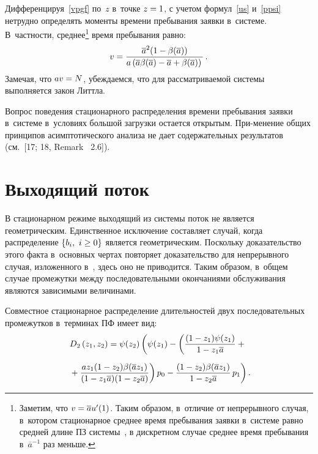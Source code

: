 \begin{multicols}{2}
Дифференцируя~\eqref{vpgf} по~$z$ в~точке $z\hm=1$,
с учетом формул~\eqref{us} и~\eqref{ppsi} нетрудно определять моменты времени
пребывания заявки в~системе. В~частности, среднее\footnote{Заметим, что
$v\hm=\overline{a} u'(1)$. Таким образом, в~отличие
от непрерывного случая, в~котором стационарное среднее время пребывания
заявки в~системе равно средней длине ПЗ системы~\cite[Corollary~2]{Mat-2},
в дискретном случае среднее время пребывания в~$\overline{a}^{-1}$ раз меньше.}
 время пребывания равно:
 \noindent
\begin{equation}
\label{vre}
v=\displaystyle\frac{\displaystyle \overline{a}^2 (1- \beta(\overline{a}))\mathstrut}{\displaystyle  a \left (\overline{a}
 \beta(\overline{a})- \overline{a} + \beta(\overline{a})\right )\mathstrut}\,.
\end{equation}
Замечая, что $av\hm=N$, убеждаемся, что для рас\-смат\-ри\-ва\-емой системы
выполняется закон Литтла.

Вопрос поведения стационарного распределения времени пребывания заявки
в~системе в~условиях большой загрузки
остается открытым. При-\linebreak менение общих принципов асимптотического \mbox{анализа}
не дает содержательных результатов (см.~[17; 18, Remark ~2.6]).



\section{Выходящий поток}

В стационарном режиме выходящий из системы поток не является геометрическим.
Единственное исключение составляет случай, когда распределение $\{ b_i, \ i \hm\ge 0 \}$
является геометрическим. Поскольку доказательство этого факта в~основных чертах\linebreak
 повторяет
доказательство для непрерывного случая, изложенного в~\cite{finch}, здесь оно не 
приводится.\linebreak
Таким образом, в~общем случае промежутки между последовательными окончаниями
обслуживания являются зависимыми величинами.


Совместное стационарное распределение длительностей двух последовательных промежутков
в~терминах ПФ имеет вид:
\begin{multline*}
D_2\left(z_1,z_2\right)
= \psi(z_2) \left ( \psi(z_1) -
\left (
\displaystyle\frac{\displaystyle (1 - z_1) \psi(z_1) \mathstrut}{\displaystyle 1 -  z_1 \overline{a}\mathstrut}
+ {}\right.\right.\\[6pt]
\left.\left.{}+\displaystyle\frac{\displaystyle a z_1 (1 - z_2) \beta(\overline{a} z_1)\mathstrut}{\displaystyle (1 - z_1 \overline{a})
(1 - z_2 \overline{a})\mathstrut}
\right)
 p_0 -
 \displaystyle\frac{\displaystyle  (1 -z_2) \beta(\overline{a} z_1)\mathstrut}{\displaystyle 1 - z_2 \overline{a}\mathstrut}\,
 p_1
\right).
\end{multline*}


\end{multicols}
